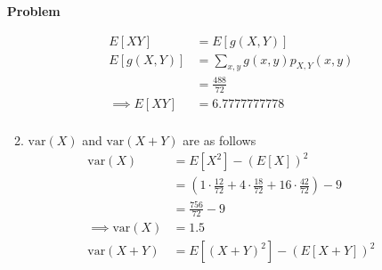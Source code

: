 \documentclass[12pt]{article}
\newenvironment{Ex}{\textbf{Problem}\vspace{.75em}\\}{}
\begin{document}
\begin{enumerate}
\begin{Ex}
\begin{solution}
\begin{enumerate}
\begin{equation}
\begin{aligned}
              E[XY] &= E[g(X,Y)] \\
              E[g(X,Y)] &= \sum_{x,y} g(x,y)p_{X,Y}(x,y) \\
              &= \frac{488}{72} \\
              \implies E[XY] &= 6.7777777778 \\
            \end{aligned}
          \end{equation}
        \item $\text{var}(X)$ and $\text{var}(X+Y)$ are as follows
          \begin{equation}
            \label{eq:2f-variances}
            \begin{aligned}
              \text{var}(X) &= E[X^2] - (E[X])^2 \\
              &=
              \left(1\cdot\frac{12}{72}+4\cdot\frac{18}{72}+16\cdot\frac{42}{72}\right)
              - 9 \\
              &= \frac{756}{72}-9 \\
              \implies \text{var}(X) &= 1.5 \\
              \text{var}(X+Y) &= E[(X+Y)^2] - (E[X+Y])^2 \\
            \end{aligned}
          \end{equation}


\end{enumerate}
\end{solution}
\end{Ex}
\end{enumerate}
\end{document}
